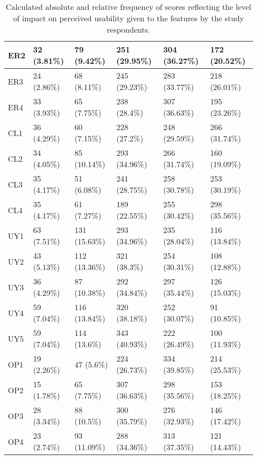 \documentclass[preprint,12pt]{elsarticle}
\begin{document}
\begin{table}[]
\begin{tabular}{|l|l|l|l|l|l|}
ER2               & 32 (3.81\%)   & 79 (9.42\%)   & 251 (29.95\%) & 304 (36.27\%) & 172 (20.52\%) \\ \hline
ER3               & 24 (2.86\%)   & 68 (8.11\%)   & 245 (29.23\%) & 283 (33.77\%) & 218 (26.01\%) \\ \hline
ER4               & 33 (3.93\%)   & 65 (7.75\%)   & 238 (28.4\%)  & 307 (36.63\%) & 195 (23.26\%) \\ \hline
CL1               & 36 (4.29\%)   & 60 (7.15\%)   & 228 (27.2\%)  & 248 (29.59\%) & 266 (31.74\%) \\ \hline
CL2               & 34 (4.05\%)   & 85 (10.14\%)  & 293 (34.96\%) & 266 (31.74\%) & 160 (19.09\%) \\ \hline
CL3               & 35 (4.17\%)   & 51 (6.08\%)   & 241 (28.75\%) & 258 (30.78\%) & 253 (30.19\%) \\ \hline
CL4               & 35 (4.17\%)   & 61 (7.27\%)   & 189 (22.55\%) & 255 (30.42\%) & 298 (35.56\%) \\ \hline
UY1               & 63 (7.51\%)   & 131 (15.63\%) & 293 (34.96\%) & 235 (28.04\%) & 116 (13.84\%) \\ \hline
UY2               & 43 (5.13\%)   & 112 (13.36\%) & 321 (38.3\%)  & 254 (30.31\%) & 108 (12.88\%) \\ \hline
UY3               & 36 (4.29\%)   & 87 (10.38\%)  & 292 (34.84\%) & 297 (35.44\%) & 126 (15.03\%) \\ \hline
UY4               & 59 (7.04\%)   & 116 (13.84\%) & 320 (38.18\%) & 252 (30.07\%) & 91 (10.85\%)  \\ \hline
UY5               & 59 (7.04\%)   & 114 (13.6\%)  & 343 (40.93\%) & 222 (26.49\%) & 100 (11.93\%) \\ \hline
OP1               & 19 (2.26\%)   & 47 (5.6\%)    & 224 (26.73\%) & 334 (39.85\%) & 214 (25.53\%) \\ \hline
OP2               & 15 (1.78\%)   & 65 (7.75\%)   & 307 (36.63\%) & 298 (35.56\%) & 153 (18.25\%) \\ \hline
OP3               & 28 (3.34\%)   & 88 (10.5\%)   & 300 (35.79\%) & 276 (32.93\%) & 146 (17.42\%) \\ \hline
OP4               & 23 (2.74\%)   & 93 (11.09\%)  & 288 (34.36\%) & 313 (37.35\%) & 121 (14.43\%) \\ \hline
\end{tabular}
\caption{\label{tab:all-features-shares}Calculated absolute and relative frequency of scores reflecting the level of impact on perceived usability given to the features by the study respondents.}
\end{table}
\end{document}
